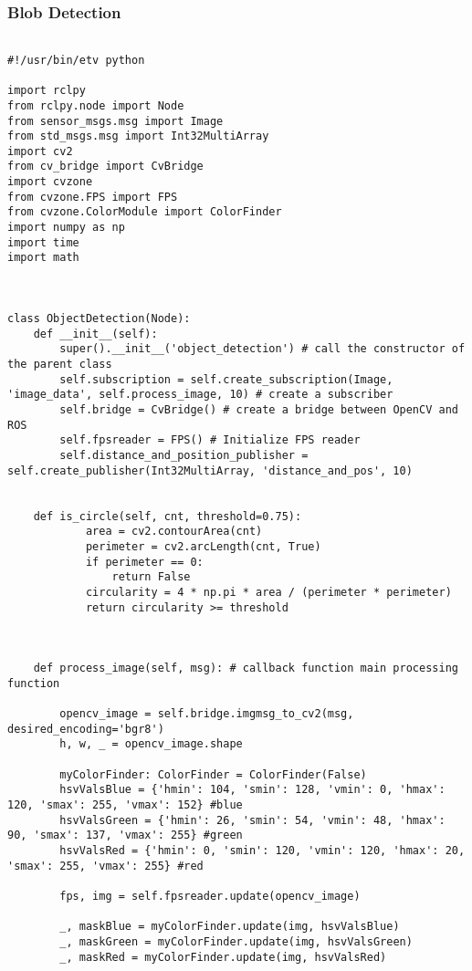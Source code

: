 \subsubsection{Blob Detection}

\begin{lstlisting}[language=PythonPlus, basicstyle=\tiny,]

#!/usr/bin/etv python

import rclpy
from rclpy.node import Node
from sensor_msgs.msg import Image
from std_msgs.msg import Int32MultiArray
import cv2
from cv_bridge import CvBridge
import cvzone
from cvzone.FPS import FPS
from cvzone.ColorModule import ColorFinder
import numpy as np
import time
import math



class ObjectDetection(Node):
    def __init__(self):
        super().__init__('object_detection') # call the constructor of the parent class
        self.subscription = self.create_subscription(Image, 'image_data', self.process_image, 10) # create a subscriber
        self.bridge = CvBridge() # create a bridge between OpenCV and ROS
        self.fpsreader = FPS() # Initialize FPS reader
        self.distance_and_position_publisher = self.create_publisher(Int32MultiArray, 'distance_and_pos', 10)


    def is_circle(self, cnt, threshold=0.75):
            area = cv2.contourArea(cnt)
            perimeter = cv2.arcLength(cnt, True)
            if perimeter == 0:
                return False
            circularity = 4 * np.pi * area / (perimeter * perimeter)
            return circularity >= threshold
    


    def process_image(self, msg): # callback function main processing function

        opencv_image = self.bridge.imgmsg_to_cv2(msg, desired_encoding='bgr8')
        h, w, _ = opencv_image.shape

        myColorFinder: ColorFinder = ColorFinder(False)
        hsvValsBlue = {'hmin': 104, 'smin': 128, 'vmin': 0, 'hmax': 120, 'smax': 255, 'vmax': 152} #blue
        hsvValsGreen = {'hmin': 26, 'smin': 54, 'vmin': 48, 'hmax': 90, 'smax': 137, 'vmax': 255} #green
        hsvValsRed = {'hmin': 0, 'smin': 120, 'vmin': 120, 'hmax': 20, 'smax': 255, 'vmax': 255} #red

        fps, img = self.fpsreader.update(opencv_image)

        _, maskBlue = myColorFinder.update(img, hsvValsBlue)
        _, maskGreen = myColorFinder.update(img, hsvValsGreen)
        _, maskRed = myColorFinder.update(img, hsvValsRed)



\end{lstlisting}
